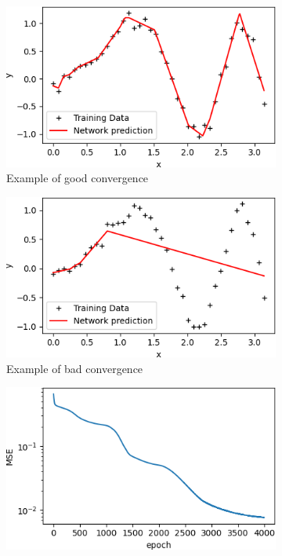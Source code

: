 \begin{figure}
     \begin{subfigure}[b]{0.49\textwidth}
         \centering
         \includegraphics[width=\textwidth]{adamgood}
         \caption{Example of good convergence}
         \label{adamgood}
     \end{subfigure}
     \begin{subfigure}[b]{0.49\textwidth}
         \centering
         \includegraphics[width=\textwidth]{adambad}
         \caption{Example of bad convergence}
         \label{adambad}
     \end{subfigure}
     \begin{subfigure}[b]{0.49\textwidth}
         \centering
         \includegraphics[width=\textwidth]{adamgoodconv}

\end{subfigure}
\end{figure}
